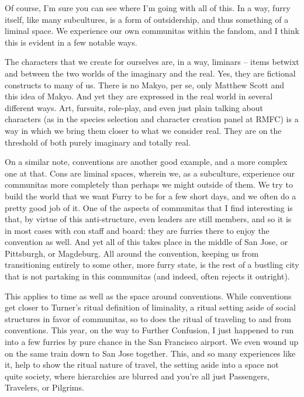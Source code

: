 Of course, I'm sure you can see where I'm going with all of this. In a way, furry itself, like many subcultures, is a form of outsidership, and thus something of a liminal space. We experience our own communitas within the fandom, and I think this is evident in a few notable ways.

The characters that we create for ourselves are, in a way, liminars -- items betwixt and between the two worlds of the imaginary and the real. Yes, they are fictional constructs to many of us. There is no Makyo, per se, only Matthew Scott and this idea of Makyo. And yet they are expressed in the real world in several different ways. Art, fursuits, role-play, and even just plain talking about characters (as in the species selection and character creation panel at RMFC) is a way in which we bring them closer to what we consider real. They are on the threshold of both purely imaginary and totally real.

On a similar note, conventions are another good example, and a more complex one at that. Cons are liminal spaces, wherein we, as a subculture, experience our communitas more completely than perhaps we might outside of them. We try to build the world that we want Furry to be for a few short days, and we often do a pretty good job of it. One of the aspects of communitas that I find interesting is that, by virtue of this anti-structure, even leaders are still members, and so it is in most cases with con staff and board: they are furries there to enjoy the convention as well. And yet all of this takes place in the middle of San Jose, or Pittsburgh, or Magdeburg. All around the convention, keeping us from transitioning entirely to some other, more furry state, is the rest of a bustling city that is not partaking in this communitas (and indeed, often rejects it outright).

This applies to time as well as the space around conventions. While conventions get closer to Turner's ritual definition of liminality, a ritual setting aside of social structures in favor of communitas, so to does the ritual of traveling to and from conventions. This year, on the way to Further Confusion, I just happened to run into a few furries by pure chance in the San Francisco airport. We even wound up on the same train down to San Jose together. This, and so many experiences like it, help to show the ritual nature of travel, the setting aside into a space not quite society, where hierarchies are blurred and you're all just Passengers, Travelers, or Pilgrims.

